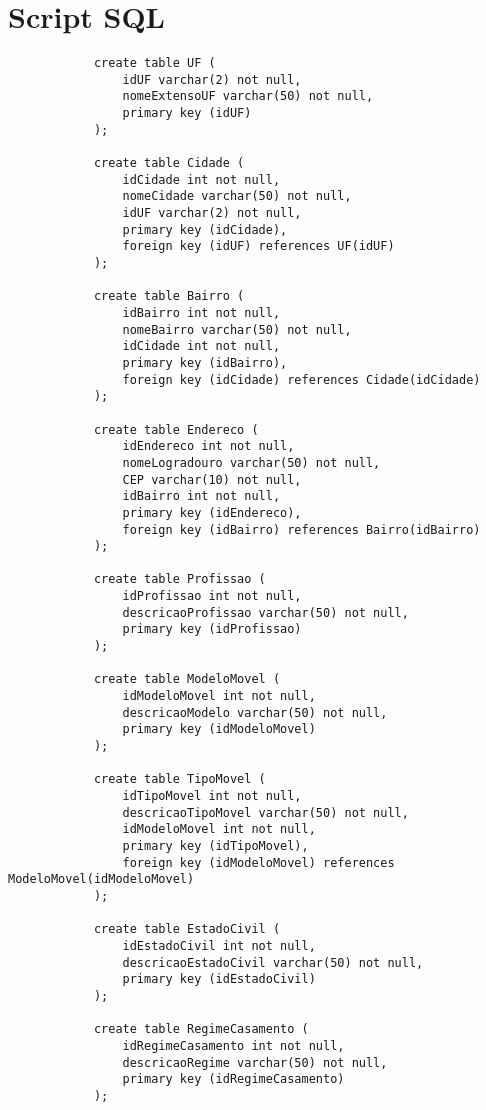 \documentclass{article}
\begin{document}
    \section{Script SQL}
        \begin{lstlisting}
            create table UF (
            	idUF varchar(2) not null,
            	nomeExtensoUF varchar(50) not null,
            	primary key (idUF)
            );
            
            create table Cidade (
            	idCidade int not null,
            	nomeCidade varchar(50) not null,
            	idUF varchar(2) not null,
            	primary key (idCidade),
            	foreign key (idUF) references UF(idUF)
            );
            
            create table Bairro (
            	idBairro int not null,
            	nomeBairro varchar(50) not null,
            	idCidade int not null,
            	primary key (idBairro),
            	foreign key (idCidade) references Cidade(idCidade)
            );
            
            create table Endereco (
            	idEndereco int not null,
            	nomeLogradouro varchar(50) not null,
            	CEP varchar(10) not null,
            	idBairro int not null,
            	primary key (idEndereco),
            	foreign key (idBairro) references Bairro(idBairro)
            );
            
            create table Profissao (
            	idProfissao int not null,
            	descricaoProfissao varchar(50) not null,
            	primary key (idProfissao)
            );
            
            create table ModeloMovel (
            	idModeloMovel int not null,
            	descricaoModelo varchar(50) not null,
            	primary key (idModeloMovel)
            );
            
            create table TipoMovel (
            	idTipoMovel int not null,
            	descricaoTipoMovel varchar(50) not null,
            	idModeloMovel int not null,
            	primary key (idTipoMovel),
            	foreign key (idModeloMovel) references ModeloMovel(idModeloMovel)
            );
            
            create table EstadoCivil (
            	idEstadoCivil int not null,
            	descricaoEstadoCivil varchar(50) not null,
            	primary key (idEstadoCivil)
            );
            
            create table RegimeCasamento (
            	idRegimeCasamento int not null,
            	descricaoRegime varchar(50) not null,
            	primary key (idRegimeCasamento)
            );
            

\end{lstlisting}
\end{document}
